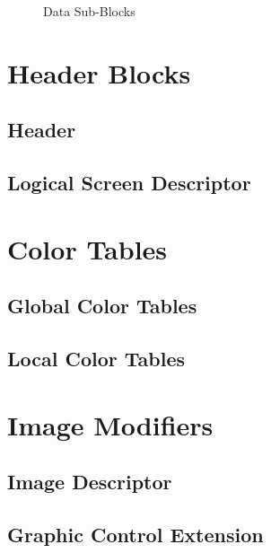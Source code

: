 \begin{refsection}
\begin{algorithm}[H]
\begin{algorithmic}[1]

    \end{algorithmic}
  \end{algorithm}

  \begin{figure}
    \centering
    \caption{\gif Data Sub-Blocks}
    \label{fig:gif-data-sub-blocks}
  \end{figure}

  \section{Header Blocks}

  \subsection{Header}

  \subsection{Logical Screen Descriptor}

  \section{Color Tables}

  \subsection{Global Color Tables}

  \subsection{Local Color Tables}

  \section{Image Modifiers}

  \subsection{Image Descriptor}

  \subsection{Graphic Control Extension}


\end{refsection}
